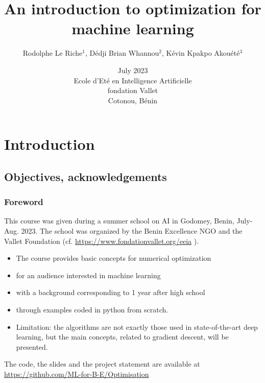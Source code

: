 \documentclass[12pt]{beamer}
\begin{document}
\title
[~Optimization for machine learning
]
{An introduction to optimization for machine learning}
\author
[Le Riche et al.]
{\large Rodolphe Le Riche$^1$, Dédji Brian Whannou$^2$, Kévin Kpakpo Akouété$^3$} 
\date[July 2023]{July 2023 \\
Ecole d'Eté en Intelligence Artificielle \\
fondation Vallet\\
Cotonou, Bénin} 
\begin{frame}
\titlepage
\end{frame}

\section{Introduction}
\subsection{Objectives, acknowledgements}

\begin{frame}
\frametitle{Foreword}
This course was given during a summer school on AI in Godomey, Benin, July-Aug. 2023.
The school was organized by the Benin Excellence NGO and the Vallet Foundation (cf. 
{\scriptsize
\url{https://www.fondationvallet.org/eeia}}
).
\begin{itemize}
\item The course provides basic concepts for numerical optimization
\item for an audience interested in machine learning
\item with a background corresponding to 1 year after high school
\item through examples coded in python from scratch.
\item Limitation: the algorithms are not exactly those used in state-of-the-art deep learning, but the main concepts, related to gradient descent, will be presented.
\end{itemize}
The code, the slides and the project statement are available at {\scriptsize \url{https://github.com/ML-for-B-E/Optimisation}}
\end{frame}
\end{document}
